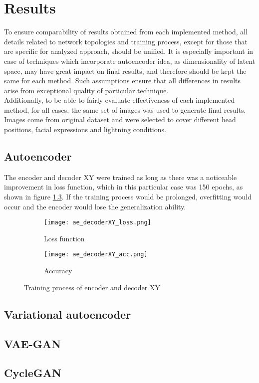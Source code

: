 \chapter{Results}
To ensure comparability of results obtained from each implemented method, all details related to network topologies and training process, except for those that are specific for analyzed approach, should be unified. It is especially important in case of techniques which incorporate autoencoder idea, as dimensionality of latent space, may have great impact on final results, and therefore should be kept the same for each method. Such assumptions ensure that all differences in results arise from exceptional quality of particular technique.\\

Additionally, to be able to fairly evaluate effectiveness of each implemented method, for all cases, the same set of images was used to generate final results. Images come from original dataset and were selected to cover different head positions, facial expressions and lightning conditions.

\section{Autoencoder}
The encoder and decoder XY were trained as long as there was a noticeable improvement in loss function, which in this particular case was 150 epochs, as shown in figure \ref{fig:ae_decoderXY}. If the training process would be prolonged, overfitting would occur and the encoder would lose the generalization ability.

\begin{figure}[H]
\centering
\begin{subfigure}{.5\textwidth}
  \centering
  \texttt{[image: ae\_decoderXY\_loss.png]}
  \caption{Loss function}
  \label{subfig:ae_decoderXY_loss}
\end{subfigure}%
\begin{subfigure}{.5\textwidth}
  \centering
  \texttt{[image: ae\_decoderXY\_acc.png]}
  \caption{Accuracy}
  \label{subfig:ae_decoderXY_acc}
\end{subfigure}
\caption{Training process of encoder and decoder XY}
\label{fig:ae_decoderXY}
\end{figure}

\section{Variational autoencoder}
\section{VAE-GAN}
\section{CycleGAN}